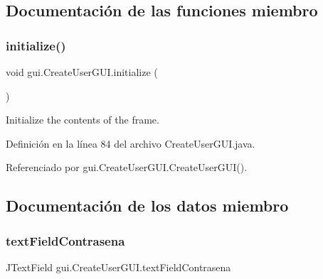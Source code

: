 \subsection{Documentación de las funciones miembro}
\mbox{\label{classgui_1_1CreateUserGUI_a781be901f97fc6bcea7d161e3d8e47c6}} 
\subsubsection{\texorpdfstring{initialize()}{initialize()}}
{\footnotesize\ttfamily void gui.\+Create\+User\+G\+U\+I.\+initialize (\begin{DoxyParamCaption}{ }\end{DoxyParamCaption})\hspace{0.3cm}{\ttfamily [private]}}

Initialize the contents of the frame. 

Definición en la línea 84 del archivo Create\+User\+G\+U\+I.\+java.


\begin{DoxyCode}{0}

\end{DoxyCode}


Referenciado por gui.\+Create\+User\+G\+U\+I.\+Create\+User\+G\+U\+I().



\subsection{Documentación de los datos miembro}
\mbox{\label{classgui_1_1CreateUserGUI_a09f197ef1142b2ec48107ace780c75ac}} 
\subsubsection{\texorpdfstring{textFieldContrasena}{textFieldContrasena}}
{\footnotesize\ttfamily J\+Text\+Field gui.\+Create\+User\+G\+U\+I.\+text\+Field\+Contrasena\hspace{0.3cm}{\ttfamily [private]}}



